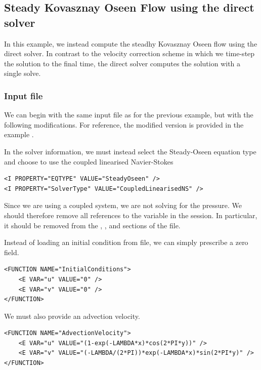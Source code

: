 \subsection{Steady Kovasznay Oseen Flow using the direct solver}
\label{s:incns:kovasznay2Ddirect}
In this example, we instead compute the steadhy Kovasznay Oseen flow
using the direct solver. In contrast to the velocity correction scheme in which
we time-step the solution to the final time, the direct solver computes the
solution with a single solve.

\subsubsection{Input file}
We can begin with the same input file as for the previous example, but with the
following modifications. For reference, the modified version is provided in the
example .

In the solver information, we must instead select the
Steady-Oseen equation type and choose to use the coupled linearised
Navier-Stokes
\begin{lstlisting}[style=XMLStyle]
<I PROPERTY="EQTYPE" VALUE="SteadyOseen" />
<I PROPERTY="SolverType" VALUE="CoupledLinearisedNS" />
\end{lstlisting}

\begin{notebox}
Since we are using a coupled system, we are not solving for the pressure. We
should therefore remove all references to the variable  in the session.
In particular, it should be removed from the ,
,  and  sections of
the file.
\end{notebox}

Instead of loading an initial condition from file, we can simply prescribe a
zero field.
\begin{lstlisting}[style=XMLStyle]
<FUNCTION NAME="InitialConditions">
    <E VAR="u" VALUE="0" />
    <E VAR="v" VALUE="0" />
</FUNCTION>
\end{lstlisting}

We must also provide an advection velocity.
\begin{lstlisting}[style=XMLStyle]
<FUNCTION NAME="AdvectionVelocity">
    <E VAR="u" VALUE="(1-exp(-LAMBDA*x)*cos(2*PI*y))" />
    <E VAR="v" VALUE="(-LAMBDA/(2*PI))*exp(-LAMBDA*x)*sin(2*PI*y)" />
</FUNCTION>
\end{lstlisting}

